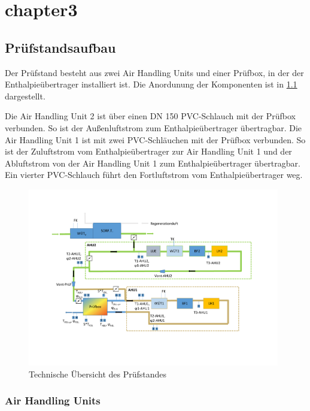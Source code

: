 \chapter{chapter3}
\label{cha:Prüfstandsaufbau}


\section{Prüfstandsaufbau}
\label{sec:Prüfstandsaufbau}

Der Prüfstand besteht aus zwei Air Handling Units und einer Prüfbox, in der der Enthalpieübertrager installiert ist. Die Anordunung der Komponenten ist in \ref{fig:Technische Übersicht des Prüfstandes} dargestellt. 

Die Air Handling Unit 2 ist über einen DN 150 PVC-Schlauch mit der Prüfbox verbunden. So ist der Außenluftstrom zum Enthalpieübertrager übertragbar. Die Air Handling Unit 1 ist mit zwei PVC-Schläuchen mit der Prüfbox verbunden. So ist der Zuluftstrom vom Enthalpieübertrager zur Air Handling Unit 1 und der Abluftstrom von der Air Handling Unit 1 zum Enthalpieübertrager übertragbar. Ein vierter PVC-Schlauch führt den Fortluftstrom vom Enthalpieübertrager weg.
 

\begin{figure} [h]
	\centering
	\includegraphics[width=0.98\textwidth]{pictures/Technische_Uebersicht_des_Pruefstandes.pdf}
	\caption{Technische Übersicht des Prüfstandes}
	\label{fig:Technische Übersicht des Prüfstandes}
\end{figure}

\subsection{Air Handling Units}
\label{Air Handling Units}

